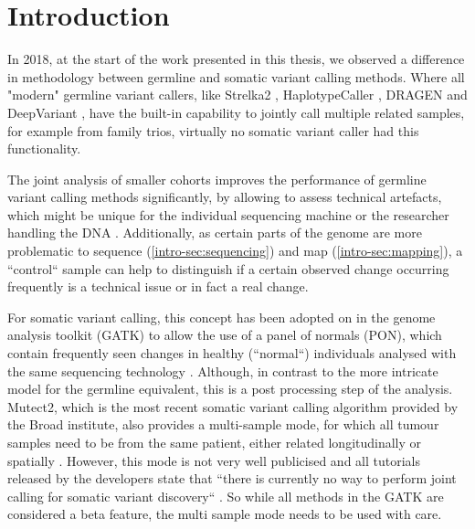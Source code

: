 \section{Introduction}
\label{variantcalling-sec:intro}
In 2018, at the start of the work presented in this thesis, we observed a difference in methodology  between germline and somatic variant calling methods. Where all "modern" germline variant callers, like Strelka2 \cite{Kim2018}, HaplotypeCaller \cite{Poplin2017}, DRAGEN \cite{Miller2015} and DeepVariant \cite{Poplin2018},  have the built-in capability to jointly call multiple related samples, for example from family trios, virtually no somatic variant caller had this functionality. 

The joint analysis of smaller cohorts improves the performance of germline variant calling methods significantly, by allowing to assess technical artefacts, which might be unique for the individual sequencing machine or the researcher handling the DNA \cite{Schirmer2016,Stoler2021}. Additionally, as certain parts of the genome are more problematic to sequence (\autoref{intro-sec:sequencing}) and map (\autoref{intro-sec:mapping}), a ``control`` sample can help to distinguish if a certain observed change occurring frequently is a technical issue or in fact a real change.

For somatic variant calling, this concept has been adopted on in the genome analysis toolkit (GATK) \cite{BrianOConnor2020} to allow the use of a panel of normals (PON), which contain frequently seen changes in healthy (``normal``) individuals analysed with the same sequencing technology \cite{GATKTeam2021}. Although, in contrast to the  more intricate model for the germline equivalent, this is a post processing step of the analysis. Mutect2, which is the most recent somatic variant calling algorithm provided by the Broad institute, also provides a multi-sample mode, for which all tumour samples need to be from the same patient, either related longitudinally or spatially \cite{GATKTeam2020}. However, this mode is not very well publicised and all tutorials released by the developers state that ``there is currently no way to perform joint calling for somatic variant discovery`` \cite{GATKTeam2021a}. So while all methods in the GATK are considered a beta feature, the multi sample mode needs to be used with care.

